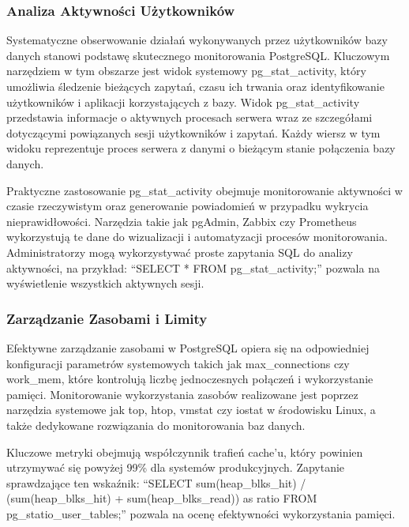 \documentclass[a4paper,11pt,openany,english]{sphinxmanual}
\begin{document}
\subsubsection{Analiza Aktywności      Użytkowników}
\label{\detokenize{rozdzial2/Monitorowanie-i-diagnostyka/index:analiza-aktywnosci-uzytkownikow}}
\sphinxAtStartPar
Systematyczne obserwowanie działań wykonywanych przez użytkowników bazy danych stanowi podstawę skutecznego monitorowania PostgreSQL. Kluczowym narzędziem w tym obszarze jest widok systemowy pg\_stat\_activity, który umożliwia śledzenie bieżących zapytań, czasu ich trwania oraz identyfikowanie użytkowników i aplikacji korzystających z bazy. Widok pg\_stat\_activity przedstawia informacje o aktywnych procesach serwera wraz ze szczegółami dotyczącymi powiązanych sesji użytkowników i zapytań. Każdy wiersz w tym widoku reprezentuje proces serwera z danymi o bieżącym stanie połączenia bazy danych.

\sphinxAtStartPar
Praktyczne zastosowanie pg\_stat\_activity obejmuje monitorowanie aktywności w czasie rzeczywistym oraz generowanie powiadomień w przypadku wykrycia nieprawidłowości. Narzędzia takie jak pgAdmin, Zabbix czy Prometheus wykorzystują te dane do wizualizacji i automatyzacji procesów monitorowania. Administratorzy mogą wykorzystywać proste zapytania SQL do analizy aktywności, na przykład: “SELECT * FROM pg\_stat\_activity;” pozwala na wyświetlenie wszystkich aktywnych sesji.


\subsubsection{Zarządzanie     Zasobami        i       Limity}
\label{\detokenize{rozdzial2/Monitorowanie-i-diagnostyka/index:zarzadzanie-zasobami-i-limity}}
\sphinxAtStartPar
Efektywne zarządzanie zasobami w PostgreSQL opiera się na odpowiedniej konfiguracji parametrów systemowych takich jak max\_connections czy work\_mem, które kontrolują liczbę jednoczesnych połączeń i wykorzystanie pamięci. Monitorowanie wykorzystania zasobów realizowane jest poprzez narzędzia systemowe jak top, htop, vmstat czy iostat w środowisku Linux, a także dedykowane rozwiązania do monitorowania baz danych.

\sphinxAtStartPar
Kluczowe metryki obejmują współczynnik trafień cache’u, który powinien utrzymywać się powyżej 99\% dla systemów produkcyjnych. Zapytanie sprawdzające ten wskaźnik: “SELECT sum(heap\_blks\_hit) / (sum(heap\_blks\_hit) + sum(heap\_blks\_read)) as ratio FROM pg\_statio\_user\_tables;” pozwala na ocenę efektywności wykorzystania pamięci.
\end{document}

